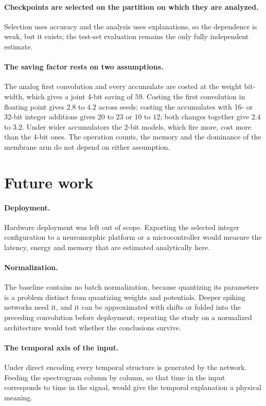 \paragraph{Checkpoints are selected on the partition on which they are
analyzed.} Selection uses accuracy and the analysis uses explanations, so the
dependence is weak, but it exists; the test-set evaluation remains the only
fully independent estimate.

\paragraph{The saving factor rests on two assumptions.} The analog first
convolution and every accumulate are costed at the weight bit-width, which gives
a joint 4-bit saving of $59$. Costing the first convolution in floating point
gives $2.8$ to $4.2$ across seeds; costing the accumulates with 16- or 32-bit
integer additions gives $20$ to $23$ or $10$ to $12$; both changes together give
$2.4$ to $3.2$. Under wider accumulators the 2-bit models, which fire more, cost
more than the 4-bit ones. The operation counts, the memory and the dominance of
the membrane arm do not depend on either assumption.

\section{Future work}

\paragraph{Deployment.} Hardware deployment was left out of scope. Exporting the
selected integer configuration to a neuromorphic platform or a microcontroller
would measure the latency, energy and memory that are estimated analytically
here.

\paragraph{Normalization.} The baseline contains no batch normalization, because
quantizing its parameters is a problem distinct from quantizing weights and
potentials. Deeper spiking networks need it, and it can be approximated with
shifts or folded into the preceding convolution before deployment; repeating the
study on a normalized architecture would test whether the conclusions survive.

\paragraph{The temporal axis of the input.} Under direct encoding every temporal
structure is generated by the network. Feeding the spectrogram column by column,
so that time in the input corresponds to time in the signal, would give the
temporal explanation a physical meaning.

